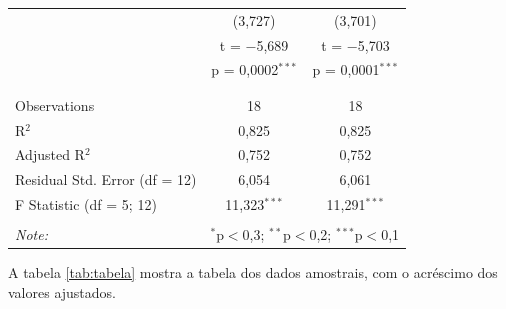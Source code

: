 \documentclass[a4paper, 12pt]{article}
\begin{document}
\begin{table}[!htbp]
\begin{tabular}{@{\extracolsep{5pt}}lcc}
  & (3,727) & (3,701) \\ 
  & t = $-$5,689 & t = $-$5,703 \\ 
  & p = 0,0002$^{***}$ & p = 0,0001$^{***}$ \\ 
  & & \\ 
\hline \\[-1.8ex] 
Observations & 18 & 18 \\ 
R$^{2}$ & 0,825 & 0,825 \\ 
Adjusted R$^{2}$ & 0,752 & 0,752 \\ 
Residual Std. Error (df = 12) & 6,054 & 6,061 \\ 
F Statistic (df = 5; 12) & 11,323$^{***}$ & 11,291$^{***}$ \\ 
\hline 
\hline \\[-1.8ex] 
\textit{Note:}  & \multicolumn{2}{r}{$^{*}$p$<$0,3; $^{**}$p$<$0,2; $^{***}$p$<$0,1} \\ 
\end{tabular} 
\end{table}

A tabela \ref{tab:tabela} mostra a tabela dos dados amostrais, com o
acréscimo dos valores ajustados.
\end{document}
